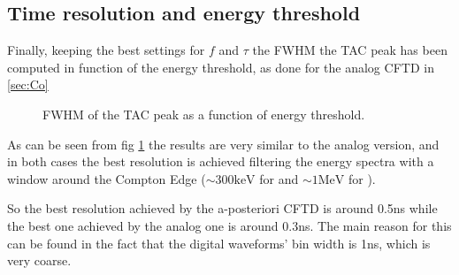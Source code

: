 \documentclass[11pt,a4 paper]{article}
\begin{document}
\subsection{Time resolution and energy threshold}
Finally, keeping the best settings for $f$ and $\tau$ the FWHM the TAC peak has been computed in function of the energy threshold, as done for the analog CFTD in \ref{sec:Co}

\begin{figure}[H]
    \centering
    \caption{FWHM of the TAC peak as a function of energy threshold.}
    \label{fig:FWHM:sim}
\end{figure}

As can be seen from fig \ref{fig:FWHM:sim} the results are very similar to the analog version, and in both cases the best resolution is achieved filtering the energy spectra with a window around the Compton Edge ($\sim 300\si{\kilo\electronvolt}$ for  and $\sim 1\si{\mega\electronvolt}$ for ).

So the best resolution achieved by the a-posteriori CFTD is around 0.5\si{\nano\second} while the best one achieved by the analog one is around 0.3\si{\nano\second}. The main reason for this can be found in the fact that the digital waveforms' bin width is 1\si{\nano\second}, which is very coarse.


\end{document}
